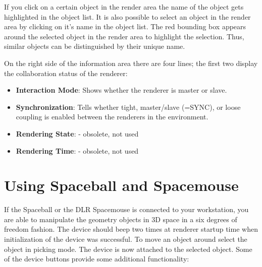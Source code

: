 If you click on a certain object in the render area the name of the object gets highlighted in the object list. It is also possible to select an object in the render area by clicking on it's name in the object list. The red bounding box appears around the selected object in the render area to highlight the selection.
Thus, similar objects can be distinguished by their unique name.


On the right side of the information area there are four lines; the first two display the
collaboration status of the renderer:

\begin{itemize}
\item {\bf Interaction Mode}: Shows whether the renderer is master or slave.

\item {\bf Synchronization}: Tells whether tight, master/slave (=SYNC), or loose coupling is enabled between the renderers in the environment.

\item {\bf Rendering State}: - obsolete, not used

\item {\bf Rendering Time}: - obsolete, not used

\end{itemize}


\section{Using Spaceball and Spacemouse}



If the Spaceball or the DLR Spacemouse is connected to your workstation, you are able to manipulate the geometry objects in 3D space in a six degrees of freedom fashion. The device should beep two times at renderer startup time when initialization of the device was successful. To move an object around select the object in picking mode. The device is now attached to the selected object. Some of the device buttons provide some additional functionality:

